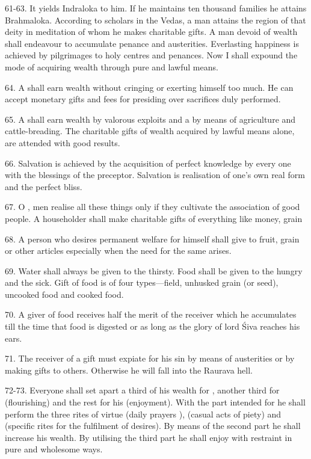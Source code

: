 61-63. It yields Indraloka to him. If he maintains ten thousand families he
attains Brahmaloka. According to scholars in the Vedas, a man attains the region
of that deity in meditation of whom he makes charitable gifts. A man devoid of
wealth shall endeavour to accumulate penance and austerities. Everlasting
happiness is achieved by pilgrimages to holy centres and penances. Now I shall
expound the mode of acquiring wealth through pure and lawful means.

64. A  shall earn wealth without cringing or exerting himself too
much. He can accept monetary gifts and fees for presiding over sacrifices duly
performed.

65. A  shall earn wealth by valorous exploits and a  by
means of agriculture and cattle-breading. The charitable gifts of wealth
acquired by lawful means alone, are attended with good results.

66. Salvation is achieved by the acquisition of perfect knowledge by every one
with the blessings of the preceptor. Salvation is realisation of one’s own real
form and the perfect bliss.

67. O , men realise all these things only if they cultivate
the association of good people. A householder shall make charitable gifts of
everything like money, grain \etc

68. A person who desires permanent welfare for himself shall give to
 fruit, grain or other articles especially when the need for
the same arises.

69. Water shall always be given to the thirsty. Food shall be given to
the hungry and the sick. Gift of food is of four types—field, unhusked grain (or
seed), uncooked food and cooked food.

70. A giver of food receives half the merit of the receiver which he accumulates
till the time that food is digested or as long as the glory of lord Śiva reaches
his ears.

71. The receiver of a gift must expiate for his sin by means of austerities or
by making gifts to others. Otherwise he will fall into the Raurava hell.

72-73. Everyone shall set apart a third of his wealth for , another
third for  (flourishing) and the rest for his  (enjoyment).
With the part intended for  he shall perform the three rites of
virtue \viz {} (daily prayers \etc),  (casual acts of
piety) and  (specific rites for the fulfilment of desires). By means
of the second part he shall increase his wealth. By utilising the third part he
shall enjoy with restraint in pure and wholesome ways.

